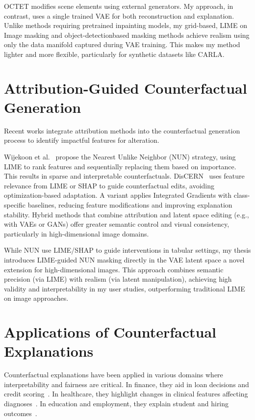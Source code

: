 OCTET modifies scene elements using external generators. My approach, in contrast, uses a single trained VAE for both reconstruction and explanation. Unlike methods requiring pretrained inpainting models, my grid-based, LIME on Image masking and object-detectionbased masking methods achieve realism using only the data manifold captured during VAE training. This makes my method lighter and more flexible, particularly for synthetic datasets like CARLA.

\section{Attribution-Guided Counterfactual Generation}
Recent works integrate attribution methods into the counterfactual generation process to identify impactful features for alteration.

Wijekoon et al.~\cite{WijekoonWNMPC21} propose the Nearest Unlike Neighbor (NUN) strategy, using LIME to rank features and sequentially replacing them based on importance. This results in sparse and interpretable counterfactuals. DisCERN~\cite{wiratunga2021discerndiscoveringcounterfactualexplanationsusing} uses feature relevance from LIME or SHAP to guide counterfactual edits, avoiding optimization-based adaptation. A variant applies Integrated Gradients with class-specific baselines, reducing feature modifications and improving explanation stability. Hybrid methods that combine attribution and latent space editing (e.g., with VAEs or GANs) offer greater semantic control and visual consistency, particularly in high-dimensional image domains.

While NUN use LIME/SHAP to guide interventions in tabular settings, my thesis introduces LIME-guided NUN masking directly in the VAE latent space a novel extension for high-dimensional images. This approach combines semantic precision (via LIME) with realism (via latent manipulation), achieving high validity and interpretability in my user studies, outperforming traditional LIME on image approaches.

\section{Applications of Counterfactual Explanations}
Counterfactual explanations have been applied in various domains where interpretability and fairness are critical. In finance, they aid in loan decisions and credit scoring~\cite{guidotti2022counterfactual, DELANEY2023103995}. In healthcare, they highlight changes in clinical features affecting diagnoses~\cite{10.1145/3351095.3372855}. In education and employment, they explain student and hiring outcomes~\cite{WijekoonWNMPC21}.

